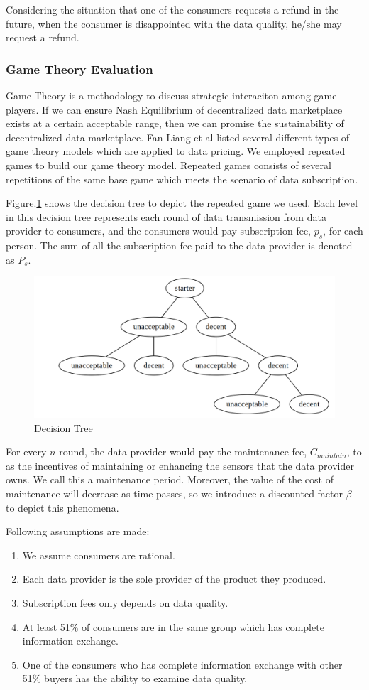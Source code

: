 \documentclass[journal,article,applsci,submit,moreauthors,pdftex]{Definitions/mdpi}
\begin{document}
Considering the situation that one of the consumers requests a refund in the future, when the consumer is disappointed with the data quality, he/she may request a refund.

\subsubsection{Game Theory Evaluation}
Game Theory is a methodology to discuss strategic interaciton among game players. If we can ensure Nash Equilibrium of decentralized data marketplace exists at a certain acceptable range, then we can promise the sustainability of decentralized data marketplace. Fan Liang et al\cite{SurveyBigDataPricing} listed several different types of game theory models which are applied to data pricing. We employed repeated games to build our game theory model. Repeated games consists of several repetitions of the same base game which meets the scenario of data subscription.

Figure.\ref{fig:decision_tree} shows the decision tree to depict the repeated game we used. Each level in this decision tree represents each round of data transmission from data provider to consumers, and the consumers would pay subscription fee, $p_s$, for each person. The sum of all the subscription fee paid to the data provider is denoted as $P_s$.

\begin{figure}[H] \centering \includegraphics[width=3.3 in]{decision_tree} \caption{Decision Tree}
    \label{fig:decision_tree} \end{figure}
For every $n$ round, the data provider would pay the maintenance fee, $C_{maintain}$, to as the incentives of maintaining or enhancing the sensors that the data provider owns. We call this a maintenance period. Moreover, the value of the cost of maintenance will decrease as time passes, so we introduce a discounted factor $\beta$ to depict this phenomena.

Following assumptions are made:
\begin{enumerate}
    \item  We assume consumers are rational. \label{rational_man}
    \item  Each data provider is the sole provider of the product they produced. \label{monopoly}
    \item  Subscription fees only depends on data quality. \label{fee_vs_quality}
    \item  At least 51\% of consumers are in the same group which has complete information exchange.\label{51_in_group}
    \item  One of the consumers who has complete information exchange with other 51\% buyers has the ability to examine  data quality. \label{1_in_51}
\end{enumerate}
\end{document}
